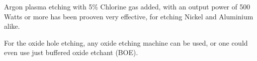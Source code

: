 Argon plasma etching with 5\% Chlorine gas added, with an output power of 500 Watts or more has been prooven very effective, for etching Nickel and Aluminium alike.

For the oxide hole etching, any oxide etching machine can be used, or one could even use just buffered oxide etchant (BOE).

\newpage




\newpage




\newpage




\newpage




